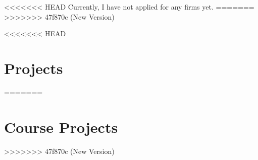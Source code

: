 \documentclass[]{resume-openfont}
\newcommand{\resumeHeading}[4]{\runsubsection{\uppercase{#1}}\descript{ | #2}\hfill\location{#3 | #4}\fakeNewLine}
\newcommand{\projectHeading}[3]{\Project{#1}{#2}
\descript{#3}\\}
\begin{document}
<<<<<<< HEAD
Currently, I have not applied for any firms yet.
=======
>>>>>>> 47f870c (New Version)

<<<<<<< HEAD
\section{Projects}
=======
\section{Course Projects}
>>>>>>> 47f870c (New Version)

  


\end{document}
